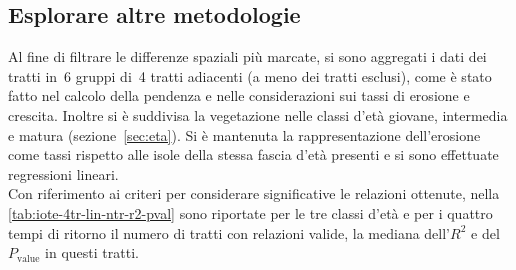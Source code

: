 \subsection{Esplorare altre metodologie}
Al fine di filtrare le differenze spaziali più marcate, si sono aggregati i dati dei tratti in~6 gruppi di~4 tratti adiacenti (a meno dei tratti esclusi), come è stato fatto nel calcolo della pendenza e nelle considerazioni sui tassi di erosione e crescita.
Inoltre si è suddivisa la vegetazione nelle classi d'età giovane, intermedia e matura (sezione~\ref{sec:eta}).
Si è mantenuta la rappresentazione dell'erosione come tassi rispetto alle isole della stessa fascia d'età presenti e si sono effettuate regressioni lineari.
\\
Con riferimento ai criteri per considerare significative le relazioni ottenute, nella \cref{tab:iote-4tr-lin-ntr-r2-pval} sono riportate per le tre classi d'età e per i quattro tempi di ritorno il numero di tratti con relazioni valide, la mediana dell'$R^2$ e del $P_\mathrm{value}$ in questi tratti.
%
